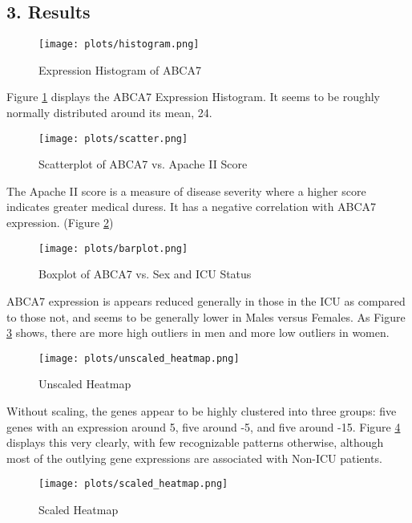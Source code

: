 \documentclass{article}
\begin{document}
\subsection*{3. Results}


\begin{figure}[h!]
    \centering
    \texttt{[image: plots/histogram.png]}
    \caption{Expression Histogram of ABCA7}
    \label{fig: Histogram}  %
\end{figure}

Figure \ref{fig: Histogram} displays the ABCA7 Expression Histogram. It seems to be roughly normally distributed around its mean, 24.

\begin{figure}[h!]
    \centering
    \texttt{[image: plots/scatter.png]}
    \caption{Scatterplot of ABCA7 vs. Apache II Score}
    \label{fig: Scatter}
\end{figure}

The Apache II score is a measure of disease severity where a higher score indicates greater medical duress. It has a negative correlation with ABCA7 expression. (Figure \ref{fig: Scatter})

\begin{figure}[h!]
    \centering
    \texttt{[image: plots/barplot.png]}
    \caption{Boxplot of ABCA7 vs. Sex and ICU Status}
    \label{fig: Boxplot}
\end{figure}

ABCA7 expression is appears reduced generally in those in the ICU as compared to those not, and seems to be generally lower in Males versus Females. As Figure \ref{fig: Boxplot} shows, there are more high outliers in men and more low outliers in women.

\begin{figure}[h!]
    \centering
    \texttt{[image: plots/unscaled\_heatmap.png]}
    \caption{Unscaled Heatmap}
    \label{fig: Unscaled Heatmap}
\end{figure}

Without scaling, the genes appear to be highly clustered into three groups: five genes with an expression around 5, five around -5, and five around -15. Figure \ref{fig: Unscaled Heatmap} displays this very clearly, with few recognizable patterns otherwise, although most of the outlying gene expressions are associated with Non-ICU patients.

\begin{figure}[h!]
    \centering
    \texttt{[image: plots/scaled\_heatmap.png]}
    \caption{Scaled Heatmap}
    \label{fig: Scaled Heatmap}
\end{figure}
\end{document}
